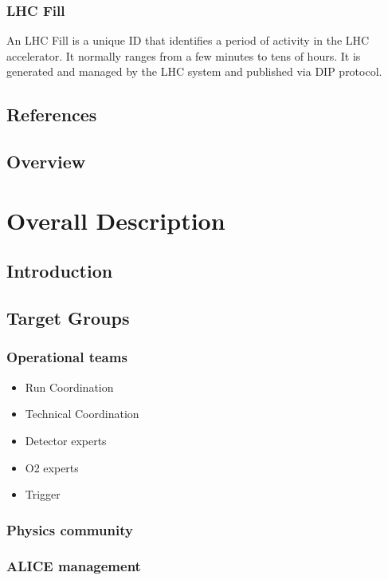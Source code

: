 \documentclass[a4paper,11pt]{book}
\begin{document}
\subsection{LHC Fill}
An LHC Fill is a unique ID that identifies a period of activity in the LHC accelerator. It normally ranges from a few minutes to tens of hours. It is generated and managed by the LHC system and published via DIP protocol. 


\section{References}

\section{Overview}


\chapter{Overall Description}
\section{Introduction}

\section{Target Groups}
\subsection{Operational teams}
\begin{itemize}
  \item Run Coordination
  \item Technical Coordination
  \item Detector experts
  \item O2 experts
  \item Trigger
\end{itemize}

\subsection{Physics community}

\subsection{ALICE management}
\end{document}

